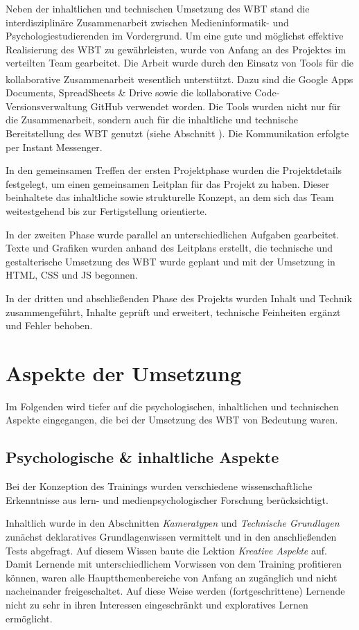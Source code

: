 \documentclass{article}
\begin{document}
Neben der inhaltlichen und technischen Umsetzung des WBT stand die interdisziplin\"are Zusammenarbeit zwischen Medieninformatik- und Psychologiestudierenden im Vordergrund. Um eine gute und m\"oglichst effektive Realisierung des WBT zu gew\"ahrleisten, wurde von Anfang an des Projektes im verteilten Team gearbeitet. Die Arbeit wurde durch den Einsatz von Tools f\"ur die kollaborative Zusammenarbeit wesentlich unterst\"utzt. Dazu sind die Google\textsuperscript{\textcopyright} Apps Documents, SpreadSheets \& Drive sowie die kollaborative Code-Versionsverwaltung GitHub verwendet worden. Die Tools wurden nicht nur f\"ur die Zusammenarbeit, sondern auch f\"ur die inhaltliche und technische Bereitstellung des WBT genutzt (siehe Abschnitt ). Die Kommunikation erfolgte per Instant Messenger.

In den gemeinsamen Treffen der ersten Projektphase wurden die Projektdetails festgelegt, um einen gemeinsamen Leitplan f\"ur das Projekt zu haben. Dieser beinhaltete das inhaltliche sowie strukturelle Konzept, an dem sich das Team weitestgehend bis zur Fertigstellung orientierte.

In der zweiten Phase wurde parallel an unterschiedlichen Aufgaben gearbeitet. Texte und Grafiken wurden anhand des Leitplans erstellt, die technische und gestalterische Umsetzung des WBT wurde geplant und mit der Umsetzung in HTML, CSS und JS begonnen.

In der dritten und abschlie{\ss}enden Phase des Projekts wurden Inhalt und Technik zusammengef\"uhrt, Inhalte gepr\"uft und erweitert, technische Feinheiten erg\"anzt und Fehler behoben.

\section{Aspekte der Umsetzung}
\label{sec:umsetzung}
Im Folgenden wird tiefer auf die psychologischen, inhaltlichen und technischen Aspekte eingegangen, die bei der Umsetzung des WBT von Bedeutung waren. 

\subsection{Psychologische \& inhaltliche Aspekte}
\label{ssec:psy}
Bei der Konzeption des Trainings wurden verschiedene wissenschaftliche Erkenntnisse aus lern- und medienpsychologischer Forschung ber\"ucksichtigt.

Inhaltlich wurde in den Abschnitten \emph{Kameratypen} und \emph{Technische Grundlagen} zun\"achst deklaratives Grundlagenwissen vermittelt und in den anschlie{\ss}enden Tests abgefragt. Auf diesem Wissen baute die Lektion \emph{Kreative Aspekte} auf. Damit Lernende mit unterschiedlichem Vorwissen von dem Training profitieren k\"onnen, waren alle Hauptthemenbereiche von Anfang an zug\"anglich und nicht nacheinander freigeschaltet. Auf diese Weise werden (fortgeschrittene) Lernende nicht zu sehr in ihren Interessen eingeschr\"ankt und exploratives Lernen erm\"oglicht.
\end{document}
